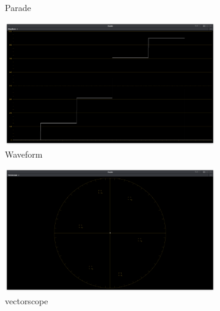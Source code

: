 \begin{figure}[ht!]
\begin{subfigure}[b]{0.475\textwidth}
            \caption[Parade]%
            {{\small Parade}}    
            \label{fig:parade-rec709onset}
        \end{subfigure}
        \quad
        \begin{subfigure}[b]{0.475\textwidth}   
            \centering 
            \includegraphics[width=\textwidth]{images/rec709/rec709_waveform}
            \caption[]%
            {{\small Waveform}}    
            \label{fig:wf-rec709onset}
        \end{subfigure}
        \begin{subfigure}[b]{0.475\textwidth}   
            \centering 
            \includegraphics[width=\textwidth]{images/rec709/rec709_vectorscope}
            \caption[]%
            {{\small vectorscope}}    
            \label{fig:vect-rec709onset}
        \end{subfigure}
        \quad
        \begin{subfigure}[b]{0.475\textwidth}   
            \centering 

\end{subfigure}
\end{figure}
